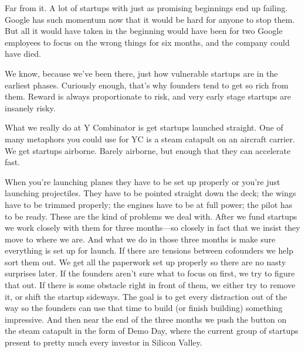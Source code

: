 Far from it. A lot of
                  startups with just as promising beginnings end up failing.
                  Google has such momentum now that it would be hard for anyone
                  to stop them. But all it would have taken in the beginning
                  would have been for two Google employees to focus on the wrong
                  things for six months, and the company could have died.

We
                  know, because we've been there, just how vulnerable startups
                  are in the earliest phases. Curiously enough, that's why
                  founders tend to get so rich from them. Reward is always
                  proportionate to risk, and very early stage startups are
                  insanely risky.

What we really do at Y Combinator
                  is get startups launched straight. One of many metaphors you
                  could use for YC is a steam catapult on an aircraft carrier.
                  We get startups airborne. Barely airborne, but enough that
                  they can accelerate fast.

When you're launching
                  planes they have to be set up properly or you're just
                  launching projectiles. They have to be pointed straight down
                  the deck; the wings have to be trimmed properly; the engines
                  have to be at full power; the pilot has to be ready. These are
                  the kind of problems we deal with. After we fund startups we
                  work closely with them for three months---so closely in
                  fact that we insist they move to where we are. And what we do
                  in those three months is make sure everything is set up for
                  launch. If there are tensions between cofounders we help sort
                  them out. We get all the paperwork set up properly so there
                  are no nasty surprises later. If the founders aren't sure what
                  to focus on first, we try to figure that out. If there is some
                  obstacle right in front of them, we either try to remove it,
                  or shift the startup sideways. The goal is to get every
                  distraction out of the way so the founders can use that time
                  to build (or finish building) something impressive. And then
                  near the end of the three months we push the button on the
                  steam catapult in the form of Demo Day, where the current
                  group of startups present to pretty much every investor in
                  Silicon Valley.

